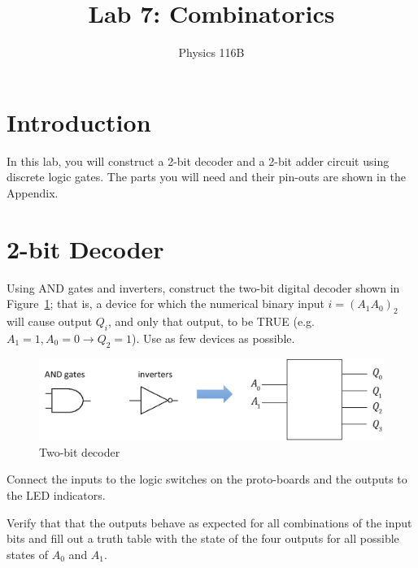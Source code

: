 \documentclass[11pt]{article}
\begin{document}


\title{Lab 7:  Combinatorics}
\author{Physics 116B}
\maketitle
\setcounter{secnumdepth}{2}

\section*{Introduction}

In this lab, you will construct a 2-bit decoder and a 2-bit adder circuit using discrete logic gates.  The parts  you will need
and their pin-outs are shown in the Appendix.

\section*{2-bit Decoder}

Using AND gates and inverters, construct the two-bit digital decoder shown in Figure~\ref{fig:decoder}; that is, a device for which the numerical binary input $i=(A_1A_0)_2$ will cause output $Q_i$, and only that output, to be TRUE (e.g. $A_1=1, A_0=0\rightarrow Q_2=1$).  Use as few devices as possible.  


\begin{figure}[h!]

\centerline{\includegraphics[width=5in]{figs/decoder.png}}
\caption{Two-bit decoder}
\label{fig:decoder}
\end{figure}




Connect the inputs to the logic switches on the proto-boards and the outputs to the LED indicators.

Verify that that the outputs behave as expected for all combinations of the input bits and fill out a truth table with the state of the four outputs for
all possible states of $A_0$ and $A_1$.
\end{document}
